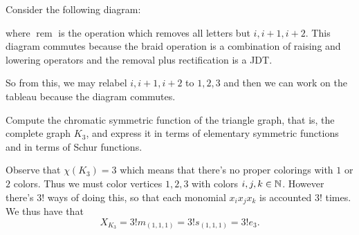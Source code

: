 \documentclass[12pt]{memoir}
\begin{document}
\begin{ptcbr}
Consider the following diagram:
\begin{center}
\end{center}
where $\operatorname{rem}$ is the operation which removes all letters but $i,i+1,i+2$. This diagram commutes because the braid operation is a combination of raising and lowering operators and the removal plus rectification is a JDT.\par
So from this, we may relabel $i,i+1,i+2$ to $1,2,3$ and then we can work on the tableau because the diagram commutes.
\end{ptcbr}

\begin{Ej}[Exercise 2]
    Compute the chromatic symmetric function of the triangle graph, that is, the complete graph $K_3$, and express it in terms of elementary symmetric functions and in terms of Schur functions.
\end{Ej}

\begin{ptcbr}
Observe that $\chi(K_3)=3$ which means that there's no proper colorings with $1$ or $2$ colors. Thus we must color vertices $1,2,3$ with colors $i,j,k\in\mathbb{N}$. However there's $3!$ ways of doing this, so that each monomial $x_ix_jx_k$ is accounted $3!$ times. We thus have that 
$$X_{K_3}=3!m_{(1,1,1)}=3!s_{(1,1,1)}=3!e_3.$$
\end{ptcbr}
\end{document}
